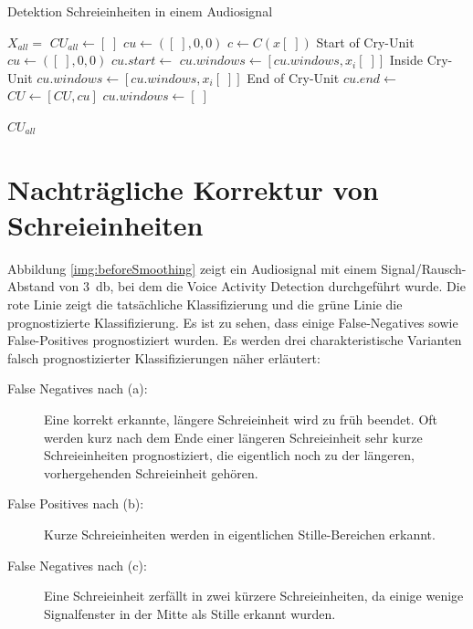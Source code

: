 \begin{algorithm}[H]
	\caption{Detektion Schreieinheiten in einem Audiosignal}
	\label{alg:cryUnit}
	\begin{algorithmic}[1]
		\State $X_{all} = $ 
		\State $ CU_{all} \gets [\;]$
		\State $ cu\gets ([\;],0,0)$
				\State $ c \gets C(x[\;])$
				\State \Comment Start of Cry-Unit
						\State $cu\gets ([\;],0,0)$
						\State $cu.start \gets $ 
						\State $cu.windows \gets [cu.windows, x_i[\;]]$
				\EndIf
				\State \Comment Inside Cry-Unit
						\State $cu.windows \gets [cu.windows, x_i[\;]]$
				\EndIf
				\State \Comment End of Cry-Unit
						\State $cu.end \gets $ 
						\State $CU \gets [CU, cu]$
						\State $cu.windows \gets [\;]$
				\EndIf
		\EndFor
		
		
		\Return $CU_{all}$
		
		\EndFunction
		
	\end{algorithmic}
\end{algorithm}


\section{Nachträgliche Korrektur von Schreieinheiten}
\label{sec:decision_smoothing_new}

Abbildung \ref{img:beforeSmoothing} zeigt ein Audiosignal mit einem Signal/Rausch-Abstand von \SI{3}{\decibel}, bei dem die Voice Activity Detection durchgeführt wurde. Die rote Linie zeigt die tatsächliche Klassifizierung und die grüne Linie die prognostizierte Klassifizierung. Es ist zu sehen, dass einige False-Negatives sowie False-Positives prognostiziert wurden. Es werden drei charakteristische Varianten falsch prognostizierter Klassifizierungen näher erläutert:

\begin{description}
	\item [False Negatives nach (a): ] Eine korrekt erkannte, längere Schreieinheit wird zu früh beendet. Oft werden kurz nach dem Ende einer längeren Schreieinheit sehr kurze Schreieinheiten prognostiziert, die eigentlich noch zu der längeren, vorhergehenden Schreieinheit gehören.
	\item [False Positives nach (b): ] Kurze Schreieinheiten werden in eigentlichen Stille-Bereichen erkannt.
	\item [False Negatives nach (c): ] Eine Schreieinheit zerfällt in zwei kürzere Schreieinheiten, da einige wenige Signalfenster in der Mitte als Stille erkannt wurden.
\end{description}

